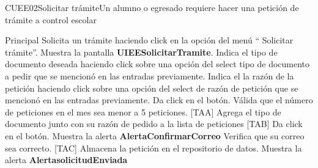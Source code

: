 \begin{UseCase}{CUEE02}{Solicitar trámite}{Un alumno o egresado requiere hacer una petición de trámite a control escolar}
{\begin{itemize}
    \end{itemize}
  }
\end{UseCase}

\begin{UCtrayectoria}{Principal}
  \UCpaso[\UCactor] Solicita un trámite haciendo click en la opción del menú `` Solicitar trámite”.
  \UCpaso Muestra la pantalla  {\bf UIEESolicitarTramite}.
  \UCpaso[\UCactor] Indica el tipo de documento deseada haciendo click sobre una opción del select tipo de documento a pedir  que se mencionó en las entradas previamente.
  \UCpaso[\UCactor] Indica el la razón de la petición haciendo click sobre una opción del select de razón de petición que se mencionó en las entradas previamente.
  \UCpaso[\UCactor] Da click en el botón.
  \UCpaso  Válida que el número de peticiones en el mes sea menor a 5 peticiones. [TAA] 
  \UCpaso Agrega el tipo de documento junto con su razón de pedido a la lista de peticiones [TAB]
  \UCpaso[\UCactor]  Da click en el botón.
  \UCpaso Muestra la alerta {\bf AlertaConfirmarCorreo} 
  \UCpaso[\UCactor] Verifica que su correo sea correcto. [TAC]
  \UCpaso Almacena la petición en el repositorio de datos.
  \UCpaso Muestra la alerta  {\bf AlertasolicitudEnviada}
\end{UCtrayectoria}


